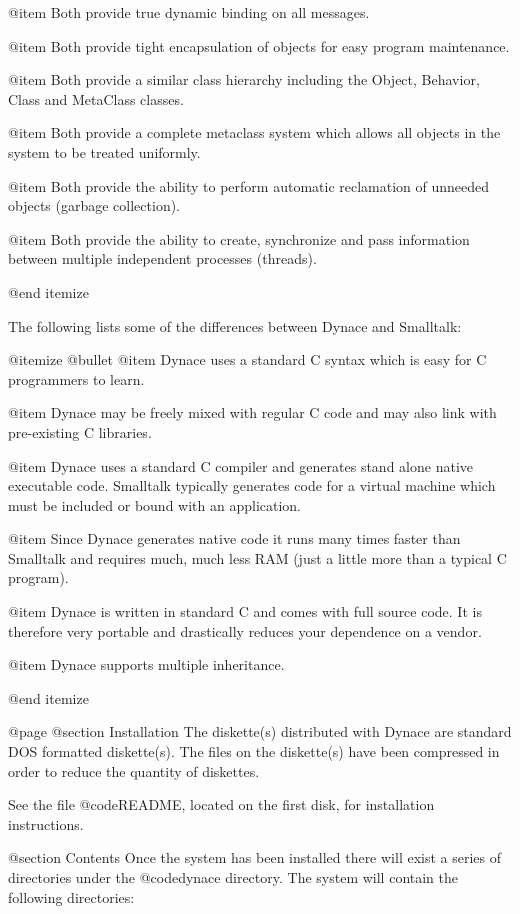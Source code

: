 @item
Both provide true dynamic binding on all messages.

@item
Both provide tight encapsulation of objects for
easy program maintenance.

@item
Both provide a similar class hierarchy including
the Object, Behavior, Class and MetaClass classes.

@item
Both provide a complete metaclass system which allows
all objects in the system to be treated uniformly.

@item
Both provide the ability to perform automatic reclamation
of unneeded objects (garbage collection).

@item
Both provide the ability to create, synchronize and
pass information between multiple independent processes (threads).

@end itemize


The following lists some of the differences between Dynace and
Smalltalk:

@itemize @bullet
@item
Dynace uses a standard C syntax which is easy for C programmers to learn.

@item
Dynace may be freely mixed with regular C code and may also link with
pre-existing C libraries.

@item
Dynace uses a standard C compiler and generates stand alone native
executable code.  Smalltalk typically generates code for a virtual
machine which must be included or bound with an application.

@item
Since Dynace generates native code it runs many times faster than Smalltalk
and requires much, much less RAM (just a little more than a typical C
program).

@item
Dynace is written in standard C and comes with full source code.  It is
therefore very portable and drastically reduces your dependence on a
vendor.

@item
Dynace supports multiple inheritance.

@end itemize




@page
@section Installation
The diskette(s) distributed with Dynace are standard DOS formatted
diskette(s).  The files on the diskette(s) have been compressed in order
to reduce the quantity of diskettes. 

See the file @code{README}, located on the first disk, for
installation instructions.





@section Contents
Once the system has been installed there will exist a series of
directories under the @code{dynace} directory.  The system will contain
the following directories:


